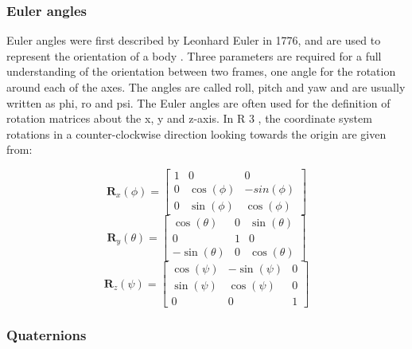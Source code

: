 \documentclass[12pt,a4paper,oneside]{article}
\begin{document}
\subsubsection{Euler angles}


Euler angles were first described by Leonhard Euler in 1776, and are used to represent the orientation of a body \citet{euler1775formulae}. Three parameters are required for a full understanding of the
orientation between two frames, one angle for the rotation around each of the axes. The angles are called roll, pitch and yaw and are usually written as phi, ro and psi. The Euler angles are often used for the definition of rotation matrices about the x, y and z-axis. In R 3 , the coordinate system rotations in a counter-clockwise direction looking towards the origin are given from:

\begin{equation}
\bm{R}_x(\phi) = \begin{bmatrix}
1 & 0 & 0 \\
0 & \cos(\phi) & -sin(\phi) \\
0 & \sin(\phi) & \cos(\phi)
\end{bmatrix}
\end{equation}
\begin{equation}
\bm{R}_y(\theta) = \begin{bmatrix}
\cos(\theta) & 0 & \sin(\theta) \\
0 & 1 & 0 \\
-\sin(\theta) & 0 & \cos(\theta)
\end{bmatrix}
\end{equation}
\begin{equation}
\bm{R}_z(\psi) = \begin{bmatrix}
\cos(\psi) & -\sin(\psi) & 0 \\
\sin(\psi) & \cos(\psi) & 0 \\
0 & 0 & 1
\end{bmatrix}
\end{equation}
\subsubsection{Quaternions}
\citet{hamilton1844lxxviii}
\citet{cayley1845xiii}
\citet{courant1953methods}
\citet{mebius2005matrix}
\citet{mathworldconjugate}
\citet{shoemake1985animating}
\citet{horn1987closed}
\end{document}
